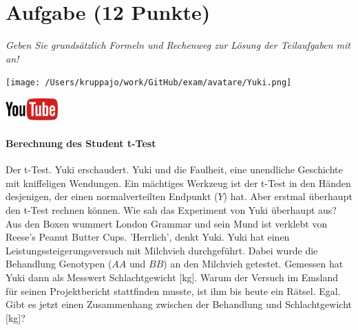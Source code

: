 \documentclass[a4paper, 9pt]{scrartcl}\usepackage[]{graphicx}\usepackage[]{xcolor}
\begin{document}
\clearpage

\section{Aufgabe \hfill (12 Punkte)}

\textit{Geben Sie grundsätzlich Formeln und Rechenweg zur Lösung der Teilaufgaben mit an!} \\[1Ex]
 

 
\begin{minipage}[t]{0.5\textwidth}
\texttt{[image: /Users/kruppajo/work/GitHub/exam/avatare/Yuki.png]}
\end{minipage}
\begin{minipage}[t]{0.5\textwidth}
\hfill
\href{https://youtu.be/Cq_rF_z4xOk}{\includegraphics[width = 2cm]{img/youtube}}
\end{minipage}
\vspace{-3ex}



\paragraph{Berechnung des Student t-Test}

Der t-Test. Yuki erschaudert. Yuki und die Faulheit, eine unendliche Geschichte mit kniffeligen Wendungen. Ein mächtiges Werkzeug ist der t-Test in den Händen desjenigen, der einen normalverteilten Endpunkt ($Y$) hat. Aber erstmal überhaupt den t-Test rechnen können. Wie sah das Experiment von Yuki überhaupt aus? Aus den Boxen wummert London Grammar und sein Mund ist verklebt von Reese's Peanut Butter Cups. 'Herrlich', denkt Yuki. Yuki hat einen Leistungssteigerungsversuch mit Milchvieh durchgeführt. Dabei wurde die Behandlung Genotypen ($AA$ und $BB$) an den Milchvieh getestet. Gemessen hat Yuki dann als Messwert Schlachtgewicht [kg]. Warum der Versuch im Emsland für seinen Projektbericht stattfinden musste, ist ihm bis heute ein Rätsel. Egal. Gibt es jetzt einen Zusammenhang zwischen der Behandlung und Schlachtgewicht [kg]?
\end{document}
